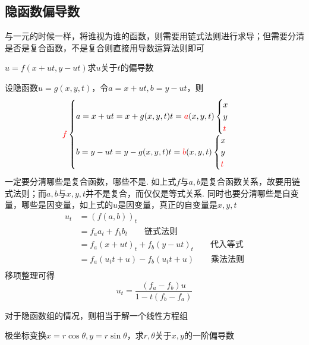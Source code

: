 \subsection{隐函数偏导数}
与一元的时候一样，将谁视为谁的函数，则需要用链式法则进行求导；但需要分清是否是复合函数，不是复合则直接用导数运算法则即可
\begin{example}
$u=f(x+ut,y-ut)$求$u$关于$t$的偏导数
\end{example}
\begin{analysis}
设隐函数$u=g(x,y,t)$，令$a=x+ut,b=y-ut$，则
\[\textcolor{red}{f}\begin{cases}a=x+ut=x+g(x,y,t)t=\textcolor{red}{a}(x,y,t)\begin{cases}x\\y\\\textcolor{red}{t}\end{cases}\\b=y-ut=y-g(x,y,t)t=\textcolor{red}{b}(x,y,t)\begin{cases}x\\y\\\textcolor{red}{t}\end{cases}\end{cases}\]
一定要分清哪些是复合函数，哪些不是. 如上式$f$与$a,b$是复合函数关系，故要用链式法则；而$a,b$与$x,y,t$并不是复合，而仅仅是等式关系.
同时也要分清哪些是自变量，哪些是因变量，如上式的$u$是因变量，真正的自变量是$x,y,t$
\[\begin{aligned}
u_t&=(f(a,b))_t\\
&=f_a a_t+f_b b_t\qquad\mbox{链式法则}\\
&=f_a (x+ut)_t + f_b (y-ut)_t\qquad\mbox{代入等式}\\
&=f_a (u_t t+u)- f_b (u_t t+u)\qquad\mbox{乘法法则}\\
\end{aligned}\]
移项整理可得
\[u_t=\dfrac{(f_a-f_b)u}{1-t(f_b-f_a)}\]
\end{analysis}
对于隐函数组的情况，则相当于解一个线性方程组
\begin{example}
极坐标变换$x=r\cos\theta,y=r\sin\theta$，求$r,\theta$关于$x,y$的一阶偏导数
\end{example}
